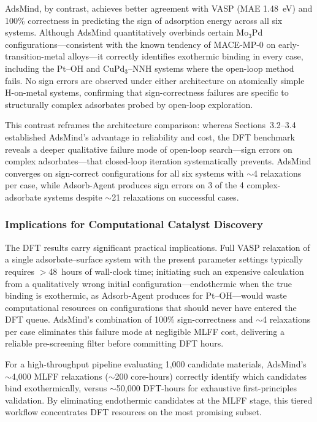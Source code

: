 AdsMind, by contrast, achieves better agreement with VASP (MAE 1.48~eV) and 100\% correctness in predicting the sign of adsorption energy across all six systems.
Although AdsMind quantitatively overbinds certain Mo$_3$Pd configurations---consistent with the known tendency of MACE-MP-0 on early-transition-metal alloys---it correctly identifies exothermic binding in every case, including the Pt--OH and CuPd$_3$--NNH systems where the open-loop method fails.
No sign errors are observed under either architecture on atomically simple H-on-metal systems, confirming that sign-correctness failures are specific to structurally complex adsorbates probed by open-loop exploration.

This contrast reframes the architecture comparison: whereas Sections~3.2--3.4 established AdsMind's advantage in reliability and cost, the DFT benchmark reveals a deeper qualitative failure mode of open-loop search---sign errors on complex adsorbates---that closed-loop iteration systematically prevents.
AdsMind converges on sign-correct configurations for all six systems with $\sim$4 relaxations per case, while Adsorb-Agent produces sign errors on 3 of the 4 complex-adsorbate systems despite $\sim$21 relaxations on successful cases.

\subsubsection{Implications for Computational Catalyst Discovery}

The DFT results carry significant practical implications.
Full VASP relaxation of a single adsorbate--surface system with the present parameter settings typically requires $>$48~hours of wall-clock time; initiating such an expensive calculation from a qualitatively wrong initial configuration---endothermic when the true binding is exothermic, as Adsorb-Agent produces for Pt--OH---would waste computational resources on configurations that should never have entered the DFT queue.
AdsMind's combination of 100\% sign-correctness and $\sim$4 relaxations per case eliminates this failure mode at negligible MLFF cost, delivering a reliable pre-screening filter before committing DFT hours.

For a high-throughput pipeline evaluating 1{,}000 candidate materials, AdsMind's $\sim$4{,}000 MLFF relaxations ($\sim$200 core-hours) correctly identify which candidates bind exothermically, versus $\sim$50{,}000 DFT-hours for exhaustive first-principles validation.
By eliminating endothermic candidates at the MLFF stage, this tiered workflow concentrates DFT resources on the most promising subset.

